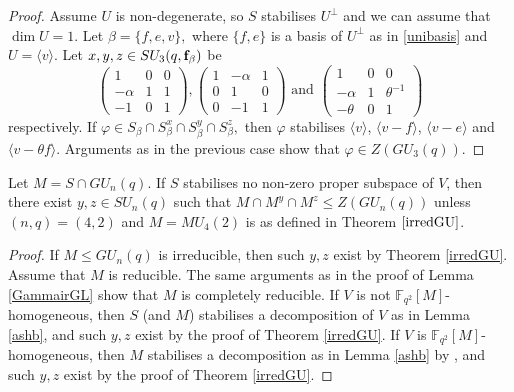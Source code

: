 \begin{proof}
 


 Assume $U$ is non-degenerate, so $S$ stabilises $U^{\bot}$ and we can assume that $\dim U=1$. Let $\beta=\{f,e,v\},$ where $\{f,e\}$ is a basis of $U^{\bot}$ as in \eqref{unibasis} and $U= \langle v\rangle$.
Let $x,y,z \in SU_3(q, {\bf f}_{\beta})$ be
$$
\begin{pmatrix}
1 & 0& 0\\
 -\alpha & 1 &1\\
-1& 0 & 1
\end{pmatrix},
\begin{pmatrix}
1 & -\alpha & 1\\
 0 & 1 &0\\
0& -1 & 1
\end{pmatrix}  \text{ and }
\begin{pmatrix}
1 & 0 & 0\\
 -\alpha & 1 &\theta^{-1}\\
-\theta & 0 & 1
\end{pmatrix} 
$$ 
respectively.
If $\varphi \in S_{\beta} \cap S_{\beta}^x \cap S_{\beta}^y  \cap S_{\beta}^z,$ then $\varphi$ stabilises $\langle v \rangle$, $\langle v-f \rangle$, $\langle v-e \rangle$ and $\langle v - \theta f \rangle.$ Arguments as in the previous case show that $\varphi \in Z(GU_3(q)).$
\end{proof}


\begin{Lem}
\label{3conjM}
Let $M=S \cap GU_n(q).$ If $S$ stabilises no non-zero proper subspace of $V$, then there exist $y,z \in SU_n(q)$ such that $M \cap M^y \cap M^z \le Z(GU_n(q))$ unless $(n,q)=(4,2)$ and $M=MU_4(2)$ is as defined in  Theorem $\ref{irredGU}$. 
\end{Lem}
\begin{proof}
If $M \le GU_n(q)$ is irreducible, then such $y,z$ exist by Theorem \ref{irredGU}. Assume that $M$ is reducible. The same arguments as in the proof of Lemma \ref{GammairGL} show that $M$ is completely reducible. If $V$ is not $\mathbb{F}_{q^2}[M]$-homogeneous, then $S$ (and $M$) stabilises a decomposition of $V$ as in Lemma \ref{ashb}, and such $y,z$ exist by the proof of Theorem \ref{irredGU}. If $V$ is  $\mathbb{F}_{q^2}[M]$-homogeneous, then $M$ stabilises a decomposition as in    Lemma \ref{ashb} by \cite[(5.2) and (5.3)]{asch}, and such $y,z$ exist by the proof of Theorem \ref{irredGU}.
\end{proof}


